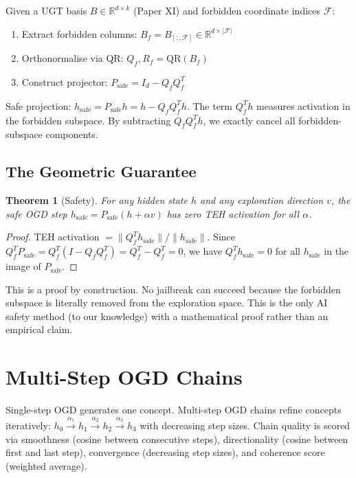 \documentclass[11pt,a4paper]{article}
\theoremstyle{plain}\newtheorem{theorem}{Theorem}[section]
\begin{document}
Given a UGT basis $B \in \mathbb{R}^{d \times k}$ (Paper XI) and forbidden coordinate indices $\mathcal{F}$:
\begin{enumerate}[nosep]
\item Extract forbidden columns: $B_f = B_{[:,\mathcal{F}]} \in \mathbb{R}^{d \times |\mathcal{F}|}$
\item Orthonormalise via QR: $Q_f, R_f = \mathrm{QR}(B_f)$
\item Construct projector: $P_{\mathrm{safe}} = I_d - Q_f Q_f^T$
\end{enumerate}
Safe projection: $h_{\mathrm{safe}} = P_{\mathrm{safe}} h = h - Q_f Q_f^T h$. The term $Q_f^T h$ measures activation in the forbidden subspace. By subtracting $Q_f Q_f^T h$, we exactly cancel all forbidden-subspace components.

\subsection{The Geometric Guarantee}

\begin{theorem}[Safety]
For any hidden state $h$ and any exploration direction $v$, the safe OGD step $h_{\mathrm{safe}} = P_{\mathrm{safe}}(h + \alpha v)$ has zero TEH activation for all $\alpha$.
\end{theorem}

\begin{proof}
TEH activation $= \|Q_f^T h_{\mathrm{safe}}\| / \|h_{\mathrm{safe}}\|$. Since $Q_f^T P_{\mathrm{safe}} = Q_f^T(I - Q_f Q_f^T) = Q_f^T - Q_f^T = 0$, we have $Q_f^T h_{\mathrm{safe}} = 0$ for all $h_{\mathrm{safe}}$ in the image of $P_{\mathrm{safe}}$.
\end{proof}

This is a proof by construction. No jailbreak can succeed because the forbidden subspace is literally removed from the exploration space. This is the only AI safety method (to our knowledge) with a mathematical proof rather than an empirical claim.

\section{Multi-Step OGD Chains}

Single-step OGD generates one concept. Multi-step OGD chains refine concepts iteratively: $h_0 \xrightarrow{\alpha_1} h_1 \xrightarrow{\alpha_2} h_2 \xrightarrow{\alpha_3} h_3$ with decreasing step sizes. Chain quality is scored via smoothness (cosine between consecutive steps), directionality (cosine between first and last step), convergence (decreasing step sizes), and coherence score (weighted average).
\end{document}
